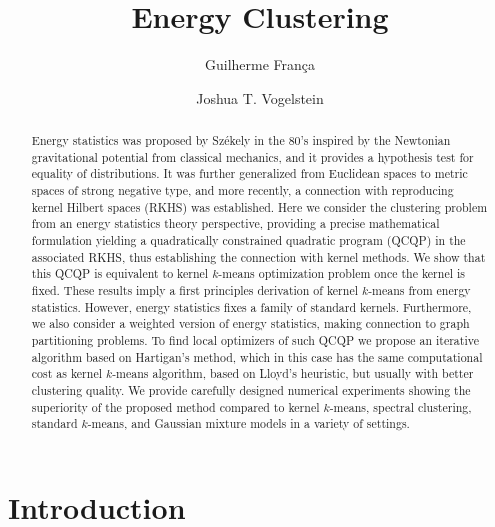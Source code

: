 \documentclass[aps,preprint,nofootinbib,floatfix]{revtex4-1}
\begin{document}
\title{Energy Clustering}

\author{Guilherme Fran\c ca}
\author{Joshua T. Vogelstein}


\begin{abstract}
Energy statistics was proposed by Sz\' ekely in the 80's inspired by the 
Newtonian gravitational potential from classical mechanics, and it provides 
a 
hypothesis test for equality of distributions. 
It was further generalized from Euclidean spaces to metric spaces of 
strong negative type, and more recently, a connection with reproducing 
kernel Hilbert spaces (RKHS) was established. 
Here we consider the clustering problem from an 
energy statistics theory perspective, 
providing a precise mathematical formulation 
yielding a quadratically constrained 
quadratic program (QCQP) in the associated RKHS, thus establishing the
connection with kernel methods. We show that this QCQP
is equivalent to kernel $k$-means optimization problem once the kernel
is fixed.
These results imply a first principles derivation of kernel $k$-means 
from energy statistics.
However, energy statistics fixes a family of standard kernels.
Furthermore, we also consider a weighted version of energy statistics, 
making connection to graph partitioning problems.
To find local optimizers of such QCQP we propose an iterative algorithm based 
on Hartigan's method, which in this case has the same computational cost 
as kernel $k$-means algorithm, based on Lloyd's heuristic, but usually 
with better clustering quality. 
We provide carefully designed numerical experiments showing the superiority 
of the proposed method compared to kernel $k$-means, spectral clustering,
standard $k$-means, and Gaussian mixture models in a variety of settings.
\end{abstract}

\maketitle


\section{Introduction}
\end{document}
